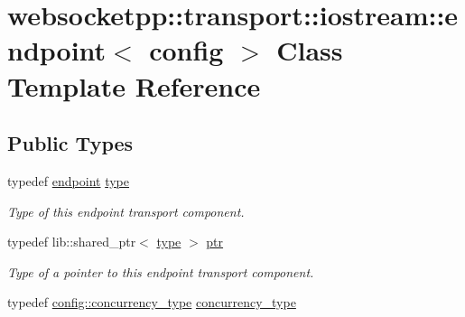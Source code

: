 \hypertarget{classwebsocketpp_1_1transport_1_1iostream_1_1endpoint}{}\section{websocketpp\+:\+:transport\+:\+:iostream\+:\+:endpoint$<$ config $>$ Class Template Reference}
\label{classwebsocketpp_1_1transport_1_1iostream_1_1endpoint}
\subsection*{Public Types}
\begin{DoxyCompactItemize}
\item 
typedef \hyperlink{classwebsocketpp_1_1transport_1_1iostream_1_1endpoint}{endpoint} \hyperlink{classwebsocketpp_1_1transport_1_1iostream_1_1endpoint_abc21958efa2ee99de526036fb21f5320}{type}\hypertarget{classwebsocketpp_1_1transport_1_1iostream_1_1endpoint_abc21958efa2ee99de526036fb21f5320}{}\label{classwebsocketpp_1_1transport_1_1iostream_1_1endpoint_abc21958efa2ee99de526036fb21f5320}

\begin{DoxyCompactList}\small\item\em Type of this endpoint transport component. \end{DoxyCompactList}\item 
typedef lib\+::shared\+\_\+ptr$<$ \hyperlink{classwebsocketpp_1_1transport_1_1iostream_1_1endpoint_abc21958efa2ee99de526036fb21f5320}{type} $>$ \hyperlink{classwebsocketpp_1_1transport_1_1iostream_1_1endpoint_a508eb595a20c2b0a15a27d68a7c0bd93}{ptr}\hypertarget{classwebsocketpp_1_1transport_1_1iostream_1_1endpoint_a508eb595a20c2b0a15a27d68a7c0bd93}{}\label{classwebsocketpp_1_1transport_1_1iostream_1_1endpoint_a508eb595a20c2b0a15a27d68a7c0bd93}

\begin{DoxyCompactList}\small\item\em Type of a pointer to this endpoint transport component. \end{DoxyCompactList}\item 
typedef \hyperlink{classwebsocketpp_1_1concurrency_1_1none}{config\+::concurrency\+\_\+type} \hyperlink{classwebsocketpp_1_1transport_1_1iostream_1_1endpoint_ad7787af753771da00bf8e6477e52b615}{concurrency\+\_\+type}\hypertarget{classwebsocketpp_1_1transport_1_1iostream_1_1endpoint_ad7787af753771da00bf8e6477e52b615}{}\label{classwebsocketpp_1_1transport_1_1iostream_1_1endpoint_ad7787af753771da00bf8e6477e52b615}


\end{DoxyCompactItemize}
